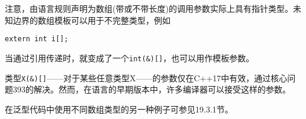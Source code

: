 注意，由语言规则声明为数组(带或不带长度)的调用参数实际上具有指针类型。未知边界的数组模板可以用于不完整类型，例如

\begin{lstlisting}[style=styleCXX]
extern int i[];
\end{lstlisting}

当通过引用传递时，就变成了一个\texttt{int(\&)[]}，也可以用作模板参数。

\begin{tcolorbox}[colback=webgreen!5!white,colframe=webgreen!75!black]
\hspace*{0.75cm}类型\texttt{X(\&)[]}——对于某些任意类型X——的参数仅在C++17中有效，通过核心问题393的解决。然而，在语言的早期版本中，许多编译器可以接受这样的参数。
\end{tcolorbox}

在泛型代码中使用不同数组类型的另一种例子可参见19.3.1节。


















